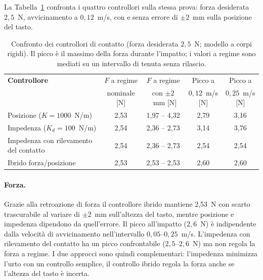 La Tabella~\ref{tab:ctrl_compare} confronta i quattro controllori sulla stessa prova: forza desiderata $2{,}5$~N, avvicinamento a $0{,}12$~m/s, con e senza errore di $\pm2$~mm sulla posizione del tasto.

\begin{table}[htbp]
    \centering
    \renewcommand{\arraystretch}{1.15}
    \footnotesize
    \begin{tabular}{|p{4.5cm}|c|c|c|c|}
        \hline
        \textbf{Controllore} & $F$ a regime & $F$ a regime & Picco a & Picco a\\
         & nominale [N] & con $\pm2$~mm [N] & $0{,}12$~m/s [N] & $0{,}25$~m/s [N]\\ \hline \hline
        Posizione ($K=1000$~N/m) & 2,53 & 1,97 -- 4,32 & 2,79 & 3,16\\
        Impedenza ($K_d=100$~N/m) & 2,54 & 2,36 -- 2,73 & 3,14 & 3,76\\
        Impedenza con rilevamento del contatto & 2,54 & 2,36 -- 2,73 & 2,54 & 2,54\\
        Ibrido forza/posizione & 2,53 & 2,53 -- 2,53 & 2,60 & 2,60\\ \hline
    \end{tabular}
    \caption{Confronto dei controllori di contatto (forza desiderata $2{,}5$~N; modello a corpi rigidi). Il picco è il massimo della forza durante l'impatto; i valori a regime sono mediati su un intervallo di tenuta senza rilascio.}
    \label{tab:ctrl_compare}
\end{table}

\paragraph{Forza.} Grazie alla retroazione di forza il controllore ibrido mantiene 2,53~N con scarto trascurabile al variare di $\pm2$~mm sull'altezza del tasto, mentre posizione e impedenza dipendono da quell'errore. Il picco all'impatto ($2{,}6$~N) è indipendente dalla velocità di avvicinamento nell'intervallo $0{,}05$--$0{,}25$~m/s. L'impedenza con rilevamento del contatto ha un picco confrontabile ($2{,}5$--$2{,}6$~N) ma non regola la forza a regime. I due approcci sono quindi complementari: l'impedenza minimizza l'urto con un controllo semplice, il controllo ibrido regola la forza anche se l'altezza del tasto è incerta.

